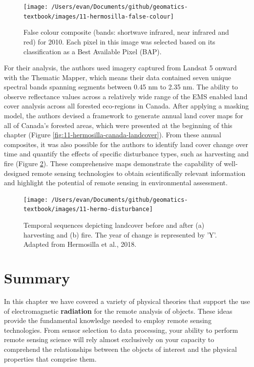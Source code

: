 \documentclass[
]{book}
\begin{document}
\begin{figure}
\texttt{[image: /Users/evan/Documents/github/geomatics-textbook/images/11-hermosilla-false-colour]} \caption{False colour composite (bands: shortwave infrared, near infrared and red) for 2010. Each pixel in this image was selected based on its classification as a Best Available Pixel (BAP).}\label{fig:11-hermo-false}
\end{figure}

For their analysis, the authors \citep{hermosilla2018} used imagery captured from
Landsat 5 onward with the Thematic Mapper, which means their data
contained seven unique spectral bands spanning segments between 0.45 nm
to 2.35 nm. The ability to observe reflectance values across a
relatively wide range of the EMS enabled land cover analysis across all
forested eco-regions in Canada. After applying a masking model, the
authors devised a framework to generate annual land cover maps for
all of Canada's forested areas, which were presented at the beginning of
this chapter (Figure \ref{fig:11-hermosilla-canada-landcover}). From
these annual composites, it was also possible for the authors to
identify land cover change over time and quantify the effects of
specific disturbance types, such as harvesting and fire (Figure
\ref{fig:11-hermo-disturb}). These comprehensive maps demonstrate the
capability of well-designed remote sensing technologies to obtain
scientifically relevant information and highlight the potential of
remote sensing in environmental assessment.

\begin{figure}
\texttt{[image: /Users/evan/Documents/github/geomatics-textbook/images/11-hermo-disturbance]} \caption{Temporal sequences depicting landcover before and after (a) harvesting and (b) fire. The year of change is represented by 'Y'. Adapted from Hermosilla et al., 2018.}\label{fig:11-hermo-disturb}
\end{figure}

\hypertarget{summary-8}{%
\section{Summary}\label{summary-8}}

In this chapter we have covered a variety of physical theories that
support the use of electromagnetic \textbf{radiation} for the remote analysis
of objects. These ideas provide the fundamental knowledge needed to
employ remote sensing technologies. From sensor selection to data
processing, your ability to perform remote sensing science will rely
almost exclusively on your capacity to comprehend the relationships
between the objects of interest and the physical properties that
comprise them.
\end{document}
